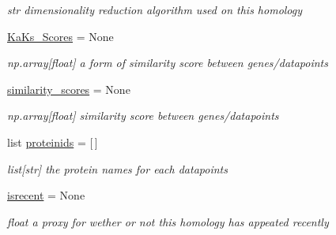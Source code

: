 \begin{DoxyCompactItemize}
\begin{DoxyCompactList}\small\item\em str dimensionality reduction algorithm used on this homology \end{DoxyCompactList}\item 
\mbox{\label{class_py_c_u_b_1_1homology_1_1homology_a3d898f87bb402fff974e77a3813c91b9}} 
\mbox{\hyperlink{class_py_c_u_b_1_1homology_1_1homology_a3d898f87bb402fff974e77a3813c91b9}{Ka\+Ks\+\_\+\+Scores}} = None
\begin{DoxyCompactList}\small\item\em np.\+array\mbox{[}float\mbox{]} a form of similarity score between genes/datapoints \end{DoxyCompactList}\item 
\mbox{\label{class_py_c_u_b_1_1homology_1_1homology_a456033ba31e423f2844163b02441f253}} 
\mbox{\hyperlink{class_py_c_u_b_1_1homology_1_1homology_a456033ba31e423f2844163b02441f253}{similarity\+\_\+scores}} = None
\begin{DoxyCompactList}\small\item\em np.\+array\mbox{[}float\mbox{]} similarity score between genes/datapoints \end{DoxyCompactList}\item 
\mbox{\label{class_py_c_u_b_1_1homology_1_1homology_a74a80cf95e01b8ac1f8547507481ab46}} 
list \mbox{\hyperlink{class_py_c_u_b_1_1homology_1_1homology_a74a80cf95e01b8ac1f8547507481ab46}{proteinids}} = \mbox{[}$\,$\mbox{]}
\begin{DoxyCompactList}\small\item\em list\mbox{[}str\mbox{]} the protein names for each datapoints \end{DoxyCompactList}\item 
\mbox{\label{class_py_c_u_b_1_1homology_1_1homology_a25b698233f4fb598400fb725c00e2c99}} 
\mbox{\hyperlink{class_py_c_u_b_1_1homology_1_1homology_a25b698233f4fb598400fb725c00e2c99}{isrecent}} = None
\begin{DoxyCompactList}\small\item\em float a proxy for wether or not this homology has appeated recently \end{DoxyCompactList}\item 

\end{DoxyCompactItemize}
